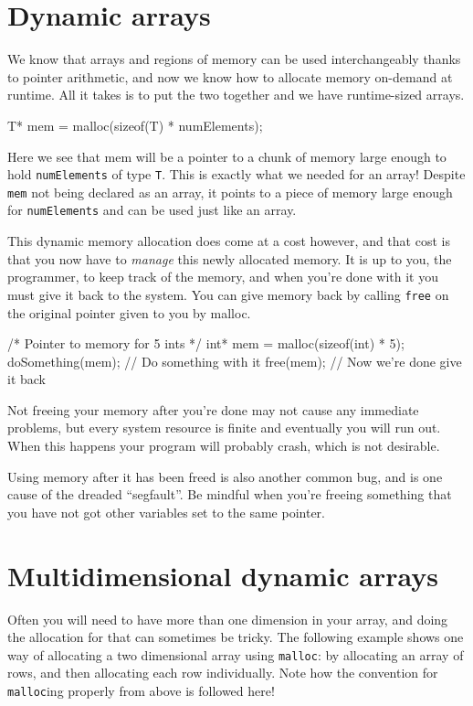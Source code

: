 \section{Dynamic arrays}

We know that arrays and regions of memory can be used interchangeably thanks to pointer arithmetic, and now we know how to allocate memory on-demand at runtime.
All it takes is to put the two together and we have runtime-sized arrays.

\begin{codeinline}
T* mem = malloc(sizeof(T) * numElements);
\end{codeinline}

Here we see that mem will be a pointer to a chunk of memory large enough to hold \texttt{numElements} of type \texttt{T}.
This is exactly what we needed for an array!
Despite \lstinline!mem! not being declared as an array, it points to a piece of memory large enough for \lstinline!numElements! and can be used just like an array.

This dynamic memory allocation does come at a cost however, and that cost is that you now have to \emph{manage} this newly allocated memory.
It is up to you, the programmer, to keep track of the memory, and when you're done with it you must give it back to the system.
You can give memory back by calling \texttt{free} on the original pointer given to you by malloc.

\begin{codeblock}
/* Pointer to memory for 5 ints */
int* mem = malloc(sizeof(int) * 5);
doSomething(mem); // Do something with it
free(mem); // Now we're done give it back
\end{codeblock}

Not freeing your memory after you're done may not cause any immediate problems, but every system resource is finite and eventually you will run out.
When this happens your program will probably crash, which is not desirable.

Using memory after it has been freed is also another common bug, and is one cause of the dreaded ``segfault''.
Be mindful when you're freeing something that you have not got other variables set to the same pointer.

\section{Multidimensional dynamic arrays}

Often you will need to have more than one dimension in your array, and doing the allocation for that can sometimes be tricky.
The following example shows one way of allocating a two dimensional array using \texttt{malloc}: by allocating an array of rows, and then allocating each row individually.
Note how the convention for \lstinline!malloc!ing properly from above is followed here! 


